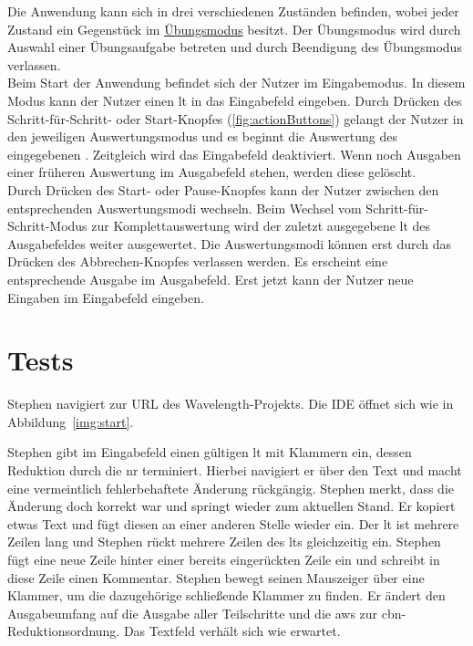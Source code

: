 \documentclass[parskip=full,11pt,twoside]{scrartcl}
\begin{document}
Die Anwendung kann sich in drei verschiedenen Zuständen befinden, wobei jeder Zustand ein Gegenstück im \hyperref[fnc:ex]{Übungsmodus} besitzt. 
Der Übungsmodus wird durch Auswahl einer Übungsaufgabe betreten und durch Beendigung des Übungsmodus verlassen.\\
Beim Start der Anwendung befindet sich der Nutzer im Eingabemodus. In diesem Modus kann der Nutzer einen \gls{lt} in das Eingabefeld eingeben. 
Durch Drücken des Schritt-für-Schritt- oder Start-Knopfes (\cref{fig:actionButtons}) gelangt der Nutzer in den jeweiligen Auswertungsmodus und es beginnt die Auswertung des eingegebenen . 
Zeitgleich wird das Eingabefeld deaktiviert. Wenn noch Ausgaben einer früheren Auswertung im Ausgabefeld stehen, werden diese gelöscht.\\ 
Durch Drücken des Start- oder Pause-Knopfes kann der Nutzer zwischen den entsprechenden Auswertungsmodi wechseln. 
Beim Wechsel vom Schritt-für-Schritt-Modus zur Komplettauswertung wird der zuletzt ausgegebene \gls{lt} des Ausgabefeldes weiter ausgewertet.
Die Auswertungsmodi können erst durch das Drücken des Abbrechen-Knopfes verlassen werden. Es erscheint eine entsprechende Ausgabe im Ausgabefeld. Erst jetzt kann der Nutzer neue Eingaben im Eingabefeld eingeben.


\section{Tests}


{Stephen navigiert zur URL des Wavelength-Projekts.}
{Die IDE öffnet sich wie in Abbildung~\ref{img:start}.}

{Stephen gibt im Eingabefeld einen gültigen \gls{lt} mit Klammern ein,
dessen Reduktion durch die \gls{nr} terminiert.
Hierbei navigiert er über den Text und macht eine vermeintlich fehlerbehaftete Änderung rückgängig. 
Stephen merkt, dass die Änderung doch korrekt war und springt wieder zum aktuellen Stand. Er kopiert etwas Text und fügt diesen an einer anderen Stelle wieder ein.
Der \gls{lt} ist mehrere Zeilen lang und Stephen rückt mehrere Zeilen des \gls{lt}s gleichzeitig ein.
Stephen fügt eine neue Zeile hinter einer bereits eingerückten Zeile ein und schreibt in diese Zeile einen Kommentar.
Stephen bewegt seinen Mauszeiger über eine Klammer, um die dazugehörige schließende Klammer zu finden.
Er ändert den Ausgabeumfang auf die Ausgabe aller Teilschritte und die \gls{aws} zur \gls{cbn}-Reduktionsordnung.}
{Das Textfeld verhält sich wie erwartet.}
\end{document}
